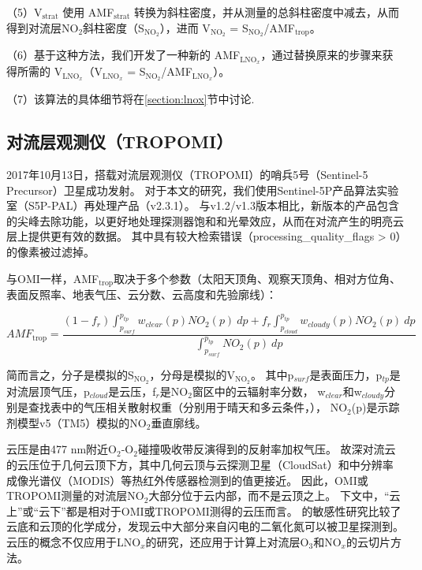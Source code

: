 （5）V$_{\textrm{strat}}$ 使用 AMF$_{\textrm{strat}}$ 转换为斜柱密度，并从测量的总斜柱密度中减去，从而得到对流层NO$_2$斜柱密度（S$_{\textrm{NO$_2$}}$），进而 V$_{\textrm{NO$_2$}}$ = S$_{\textrm{NO$_2$}}$/AMF$_{\textrm{trop}}$。

（6）基于这种方法，我们开发了一种新的 AMF$_\textrm{LNO$_x$}$，通过替换原来的步骤来获得所需的 V$_\textrm{LNO$_x$}$（V$_\textrm{LNO$_x$}$ = S$_{\textrm{NO$_2$}}$/AMF$_\textrm{LNO$_x$}$）。

（7）该算法的具体细节将在\ref{section:lnox}节中讨论.

\subsection{对流层观测仪（TROPOMI）}

2017年10月13日，搭载对流层观测仪（TROPOMI）的哨兵5号（Sentinel-5 Precursor）卫星成功发射\citep{Veefkind.2012}。
对于本文的研究，我们使用Sentinel-5P产品算法实验室（S5P-PAL）再处理产品（v2.3.1）。
与v1.2/v1.3版本相比，新版本的产品包含的尖峰去除功能，以更好地处理探测器饱和和光晕效应，从而在对流产生的明亮云层上提供更有效的数据\citep{Ludewig.2020,VanGeffen.2022}。
其中具有较大检索错误（processing\_quality\_flags > 0）的像素被过滤掉。

与OMI一样，AMF$_{\textrm{trop}}$取决于多个参数（太阳天顶角、观察天顶角、相对方位角、表面反照率、地表气压、云分数、云高度和先验廓线）：

\begin{equation} \label{eq:AMF_NO2}
AMF_{\textrm{trop}} = \frac{(1-f_r) \int_{p_{surf}}^{p_{tp}} w_{clear}(p) NO_2(p) \: dp + f_r \int_{p_{cloud}}^{p_{tp}} w_{cloudy}(p) NO_2(p) \: dp}{\int_{p_{surf}}^{p_{tp}} NO_2(p) \: dp}
\end{equation}

简而言之，分子是模拟的S$_{\textrm{NO$_2$}}$，分母是模拟的V$_{\textrm{NO$_2$}}$。
其中p$_{surf}$是表面压力，p$_{tp}$是对流层顶气压，p$_{cloud}$是云压，f$_{r}$是NO$_2$窗区中的云辐射率分数，
w$_{clear}$和w$_{cloudy}$分别是查找表中的气压相关散射权重（分别用于晴天和多云条件，\citet{Lorente.2017}），
NO$_2$(p)是示踪剂模型v5（TM5）模拟的NO$_2$垂直廓线。

云压是由477 nm附近O$_2$-O$_2$碰撞吸收带反演得到的反射率加权气压\citep{Acarreta.2004,Sneep.2008,Stammes.2008}。
故深对流云的云压位于几何云顶下方，其中几何云顶与云探测卫星（CloudSat）和中分辨率成像光谱仪（MODIS）等热红外传感器检测到的值更接近\citep{Vasilkov.2008,Joiner.2012}。
因此，OMI或TROPOMI测量的对流层NO$_2$大部分位于云内部，而不是云顶之上。
下文中，“云上”或“云下”都是相对于OMI或TROPOMI测得的云压而言。
\citet{Beirle.2009}的敏感性研究比较了云底和云顶的化学成分，发现云中大部分来自闪电的二氧化氮可以被卫星探测到。
云压的概念不仅应用于LNO$_x$的研究，还应用于计算上对流层O$_3$和NO$_x$的云切片方法\citep{Ziemke.2009,Choi.2014,Strode.2017,Ziemke.2017,Marais.2018}。

